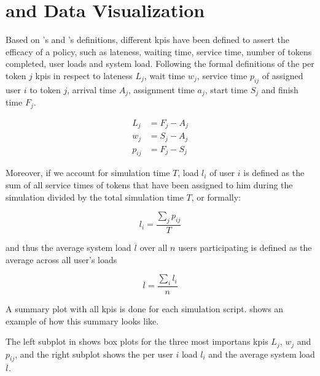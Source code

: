 \section{ and Data Visualization}

Based on \citet{Pinedo2008}'s and \citet{Zeng2005}'s definitions, different \glspl{kpi} have been defined to assert the efficacy of a policy, such as lateness, waiting time, service time, number of tokens completed, user loads and system load. Following the formal definitions of the per token $j$ \glspl{kpi} in respect to lateness $L_j$, wait time $w_j$, service time $p_{ij}$ of assigned user $i$ to token $j$, arrival time $A_j$, assignment time $a_j$, start time $S_j$ and finish time $F_j$.

\begin{align}
	L_j&=F_j-A_j \label{eq:lateness}\\
	w_j&=S_j-A_j \\
	p_{ij}&=F_j-S_j
\end{align}

Moreover, if we account for simulation time $T$, load $l_i$ of user $i$ is defined as the sum of all service times of tokens that have been assigned to him during the simulation divided by the total simulation time $T$, or formally:

\begin{equation}
	l_i=\frac{\sum_j p_{ij}}{T}
\end{equation}

and thus the average system load $\overline{l}$ over all $n$ users participating is defined as the average across all user's loads \ie

\begin{equation}
	\overline{l} = \frac{\sum_i l_i}{n}
\end{equation}

A summary plot with all \glspl{kpi} is done for each simulation script.  shows an example of how this summary looks like.


The left subplot in  shows box plots for the three most importans \glspl{kpi} \ie $L_j$, $w_j$ and $p_{ij}$, and the right subplot shows the per user $i$ load $l_i$ and the average system load $\overline{l}$.

